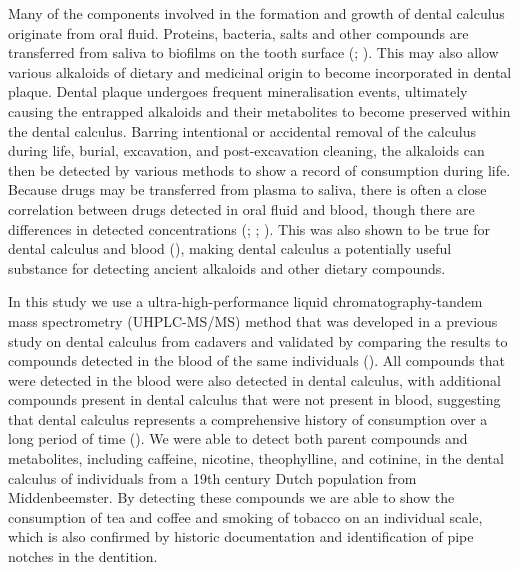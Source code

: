 \documentclass[
  11pt,
  leqno]{scrartcl}
\begin{document}
Many of the components involved in the formation and growth of dental
calculus originate from oral fluid. Proteins, bacteria, salts and other
compounds are transferred from saliva to biofilms on the tooth surface
(;
). This may also
allow various alkaloids of dietary and medicinal origin to become
incorporated in dental plaque. Dental plaque undergoes frequent
mineralisation events, ultimately causing the entrapped alkaloids and
their metabolites to become preserved within the dental calculus.
Barring intentional or accidental removal of the calculus during life,
burial, excavation, and post-excavation cleaning, the alkaloids can then
be detected by various methods to show a record of consumption during
life. Because drugs may be transferred from plasma to saliva, there is
often a close correlation between drugs detected in oral fluid and
blood, though there are differences in detected concentrations
(;
;
). This was
also shown to be true for dental calculus and blood
(),
making dental calculus a potentially useful substance for detecting
ancient alkaloids and other dietary compounds.

In this study we use a ultra-high-performance liquid
chromatography-tandem mass spectrometry (UHPLC-MS/MS) method that was
developed in a previous study on dental calculus from cadavers and
validated by comparing the results to compounds detected in the blood of
the same individuals (). All compounds that were detected in the blood were also
detected in dental calculus, with additional compounds present in dental
calculus that were not present in blood, suggesting that dental calculus
represents a comprehensive history of consumption over a long period of
time ().
We were able to detect both parent compounds and metabolites, including
caffeine, nicotine, theophylline, and cotinine, in the dental calculus
of individuals from a 19th century Dutch population from Middenbeemster.
By detecting these compounds we are able to show the consumption of tea
and coffee and smoking of tobacco on an individual scale, which is also
confirmed by historic documentation and identification of pipe notches
in the dentition.
\end{document}
